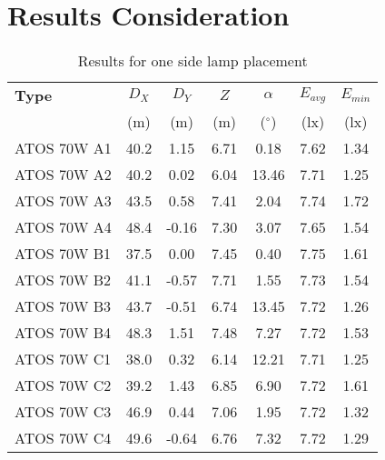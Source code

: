 \section{Results Consideration}

\begin{table}[htb]
	\renewcommand{\arraystretch}{1.3}
	\caption{Results for one side lamp placement}
 	\label{tab:onesideLamps}
	\centering
  \begin{tabular}{ l | c | c | c | c | c | c }
    \hline
    \textbf{Type} & $D_X$ & $D_Y$ & $Z$ & $\alpha$ & $E_{avg}$ & $E_{min}$\\ 
    & (m) & (m) & (m) & ($^\circ$) & (lx) & (lx)\\ \hline
    ATOS 70W A1 & 40.2 & 1.15 & 6.71 & 0.18 & 7.62 & 1.34 \\ \hline
    ATOS 70W A2 & 40.2 & 0.02 & 6.04 & 13.46 & 7.71 & 1.25\\ \hline
    ATOS 70W A3 & 43.5 & 0.58 & 7.41 & 2.04 & 7.74 & 1.72\\ \hline
    ATOS 70W A4 & 48.4 & -0.16 & 7.30 & 3.07 & 7.65 & 1.54\\ \hline\hline
    ATOS 70W B1 & 37.5 & 0.00 & 7.45 & 0.40 & 7.75 & 1.61\\ \hline
    ATOS 70W B2 & 41.1 & -0.57 & 7.71 & 1.55 & 7.73 & 1.54\\ \hline
    ATOS 70W B3 & 43.7 & -0.51 & 6.74 & 13.45 & 7.72 & 1.26\\ \hline
    ATOS 70W B4 & 48.3 & 1.51 & 7.48 & 7.27 & 7.72 & 1.53\\ \hline\hline
    ATOS 70W C1 & 38.0 & 0.32 & 6.14 & 12.21 & 7.71 & 1.25\\ \hline
    ATOS 70W C2 & 39.2 & 1.43 & 6.85 & 6.90 & 7.72 & 1.61\\ \hline
    ATOS 70W C3 & 46.9 & 0.44 & 7.06 & 1.95 & 7.72 & 1.32\\ \hline
    ATOS 70W C4 & 49.6 & -0.64 & 6.76 & 7.32 & 7.72 & 1.29\\ \hline
  \end{tabular}
\end{table}

